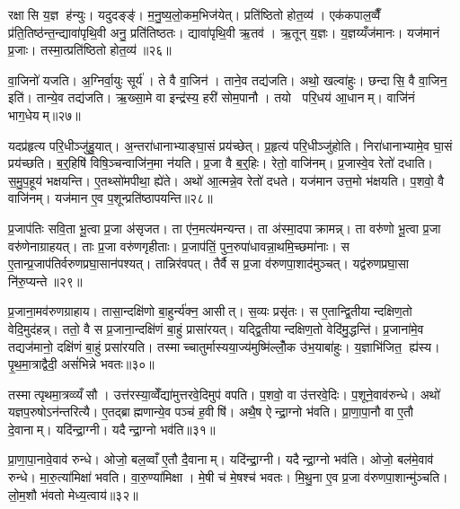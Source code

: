 रक्षासि य॒ज्ञ ह॑न्युः। यदुदङ्ङ्॑। म॒नु॒ष्य॒लो॒कम॒भिज॑येत्। प्रति॑ष्ठितो होत॒व्य॑। एक॑कपाल॒व्वैँ प्र॑ति॒तिष्ठ॑न्त॒न्द्यावा॑पृथि॒वी अनु॒ प्रति॑तिष्ठतः। द्यावा॑पृथि॒वी ऋ॒तव॑। ऋ॒तून् य॒ज्ञः। य॒ज्ञय्यँज॑मानः। यज॑मानं प्र॒जाः। तस्मा॒त्प्रति॑ष्ठितो होत॒व्य॑॥२६॥

वा॒जिनो॑ यजति। अ॒ग्निर्वा॒युः सूर्य॑। ते वै वा॒जिन॑। ताने॒व तद्य॑जति। अथो॒ खल्वा॑हुः। छन्दासि॒ वै वा॒जिन॒ इति॑। तान्ये॒व तद्य॑जति। ऋ॒ख्सा॒मे वा इन्द्र॑स्य॒ हरी॑ सोम॒पानौ। तयो परि॒धय॑ आ॒धानम्। वाजि॑नं भाग॒धेयम्॥२७॥

यदप्र॑हृत्य परि॒धीञ्जु॑हु॒यात्। अ॒न्तरा॑धानाभ्याङ्घा॒सं प्रय॑च्छेत्। प्र॒हृत्य॑ परि॒धीञ्जु॑होति। निरा॑धानाभ्यामे॒व घा॒सं प्रय॑च्छति। ब॒र्॒हिषि॑ विषि॒ञ्चन्वाजि॑न॒मा न॑यति। प्र॒जा वै ब॒र्॒हिः। रेतो॒ वाजि॑नम्। प्र॒जास्वे॒व रेतो॑ दधाति। स॒मु॒प॒हूय॑ भक्षयन्ति। ए॒तथ्सो॑मपीथा॒ ह्ये॑ते। अथो॑ आ॒त्मन्ने॒व रेतो॑ दधते। यज॑मान उत्त॒मो भ॑क्षयति। प॒शवो॒ वै वाजि॑नम्। यज॑मान ए॒व प॒शून्प्रति॑ष्ठापयन्ति॥२८॥\anuvakamend[लो॒को ब॑हुरू॒पं भ॑व॒त्याज्य॑भागौ प॒शव॒ आज्य॑मव॒द्येदा॑हव॒नीय॑ प्र॒त्यक्तस्मा॒त्प्रति॑ष्ठितो होत॒व्यो॑ भाग॒धेय॑मे॒ते च॒त्वारि॑ च]

प्र॒जाप॑तिः सवि॒ता भू॒त्वा प्र॒जा अ॑सृजत। ता ए॑न॒मत्य॑मन्यन्त। ता अ॑स्मा॒दपाक्रामन्न्। ता वरु॑णो भू॒त्वा प्र॒जा वरु॑णेनाग्राहयत्। ताः प्र॒जा वरु॑णगृहीताः। प्र॒जाप॑तिं॒ पुन॒रुपा॑धावन्ना॒थमि॒च्छमा॑नाः। स ए॒तान्प्र॒जाप॑तिर्वरुणप्रघा॒सान॑पश्यत्। तान्निर॑वपत्। तैर्वै स प्र॒जा व॑रुणपा॒शाद॑मुञ्चत्। यद्व॑रुणप्रघा॒सा नि॑रु॒प्यन्ते॥२९॥

प्र॒जाना॒मव॑रुणग्राहाय। तासा॒न्दक्षि॑णो बा॒हुर्न्य॑क्न॒ आसीत्। स॒व्यः प्रसृ॑तः। स ए॒तान्द्वि॒तीयान्दक्षिण॒तो वेदि॒मुद॑हन्न्। ततो॒ वै स प्र॒जाना॒न्दक्षि॑णं बा॒हुं प्रासा॑रयत्। यद्द्वि॒तीयान्दक्षिण॒तो वेदि॑मु॒द्धन्ति॑। प्र॒जाना॑मे॒व तद्यज॑मानो॒ दक्षि॑णं बा॒हुं प्रसा॑रयति। तस्माच्चातुर्मास्यया॒ज्य॑मुष्मि॑ल्लोँ॒क उ॑भ॒याबा॑हुः। य॒ज्ञाभि॑जित॒ ह्य॑स्य। पृ॒थ॒मा॒त्राद्वैदी॒ असं॑भिन्ने भवतः॥३०॥

तस्मात्पृथमा॒त्रव्व्यँसौ। उत्त॑रस्या॒व्वेँद्या॑मुत्तरवे॒दिमुप॑ वपति। प॒शवो॒ वा उ॑त्तरवे॒दिः। प॒शूने॒वाव॑रुन्धे। अथो॑ यज्ञप॒रुषोऽन॑न्तरित्यै। ए॒तद्ब्राह्मणान्ये॒व पञ्च॑ ह॒वीषि॑। अथै॒ष ऐन्द्रा॒ग्नो भ॑वति। प्रा॒णा॒पा॒नौ वा ए॒तौ दे॒वानाम्। यदि॑न्द्रा॒ग्नी। यदैन्द्रा॒ग्नो भव॑ति॥३१॥

प्रा॒णा॒पा॒नावे॒वाव॑ रुन्धे। ओजो॒ बल॒व्वाँ ए॒तौ दै॒वानाम्। यदि॑न्द्रा॒ग्नी। यदैन्द्रा॒ग्नो भव॑ति। ओजो॒ बल॑मे॒वाव॑ रुन्धे। मा॒रु॒त्या॑मिक्षा॑ भवति। वा॒रु॒ण्या॑मिक्षा। मे॒षी च॑ मे॒षश्च॑ भवतः। मि॒थु॒ना ए॒व प्र॒जा व॑रुणपा॒शान्मु॑ञ्चति। लो॒म॒शौ भ॑वतो मेध्य॒त्वाय॑॥३२॥

